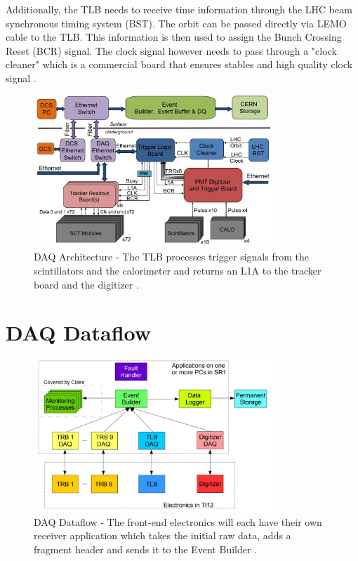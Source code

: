 Additionally, the TLB needs to receive time information through the LHC beam synchronous timing system (BST). The orbit can be passed directly via LEMO cable to the TLB. This information is then used to assign the Bunch Crossing Reset (BCR) signal. The clock signal however needs to pass through a "clock cleaner" which is a commercial board that ensures stables and high quality clock signal \cite{sfyrla_central_2019}.

\begin{figure}[htbp!] 
\centering    
\includegraphics[width=0.8\textwidth]{ChapterDAQ/Figs/GeneralDAQ/Architecture.jpg}
\caption[DAQ Architecture]{DAQ Architecture - The TLB processes trigger signals from the scintillators and the calorimeter and returns an L1A to the tracker board and the digitizer \cite{noauthor_faser_nodate}.}
\label{fig:DAQArchitecture}
\end{figure}


\section{DAQ Dataflow}


\begin{figure}[htbp!] 
\centering    
\includegraphics[width=0.8\textwidth]{ChapterDAQ/Figs/GeneralDAQ/DAQDataFlow.jpg}
\caption[DAQ Dataflow]{DAQ Dataflow - The front-end electronics will each have their own receiver application which takes the initial raw data, adds a fragment header and sends it to the Event Builder \cite{noauthor_faser_nodate}.}
\label{fig:DAQDataFlow}
\end{figure}

